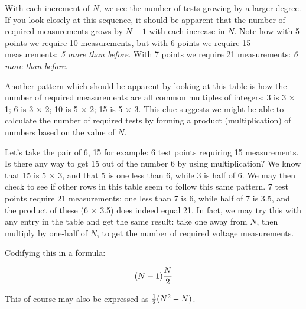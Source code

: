 With each increment of $N$, we see the number of tests growing by a larger degree.  If you look closely at this sequence, it should be apparent that the number of required measurements grows by $N-1$ with each increase in $N$.  Note how with 5 points we require 10 measurements, but with 6 points we require 15 measurements: {\it 5 more than before}.  With 7 points we require 21 measurements: {\it 6 more than before}.

Another pattern which should be apparent by looking at this table is how the number of required measurements are all common multiples of integers: 3 is 3 $\times$ 1; 6 is 3 $\times$ 2; 10 is 5 $\times$ 2; 15 is 5 $\times$ 3.  This clue suggests we might be able to calculate the number of required tests by forming a product (multiplication) of numbers based on the value of $N$.

Let's take the pair of 6, 15 for example: 6 test points requiring 15 measurements.  Is there any way to get 15 out of the number 6 by using multiplication?  We know that 15 is 5 $\times$ 3, and that 5 is one less than 6, while 3 is half of 6.  We may then check to see if other rows in this table seem to follow this same pattern.  7 test points require 21 measurements: one less than 7 is 6, while half of 7 is 3.5, and the product of these (6 $\times$ 3.5) does indeed equal 21.  In fact, we may try this with any entry in the table and get the same result: take one away from $N$, then multiply by one-half of $N$, to get the number of required voltage measurements.

\vskip 10pt

\filbreak

Codifying this in a formula:

$$(N-1){N \over 2}$$

This of course may also be expressed as ${1 \over 2}(N^2 - N)$.




